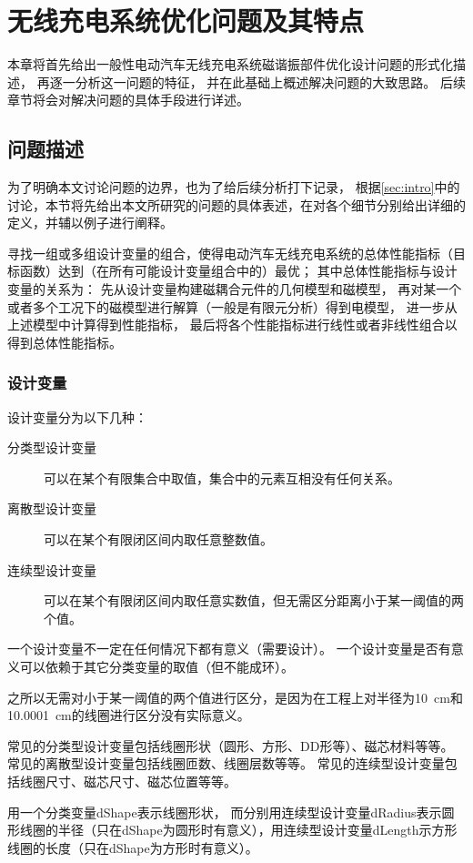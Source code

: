 \documentclass[index]{subfiles}
\begin{document}
\chapter{无线充电系统优化问题及其特点}\label{sec:fea}
本章将首先给出一般性电动汽车无线充电系统磁谐振部件优化设计问题的形式化描述，
再逐一分析这一问题的特征，
并在此基础上概述解决问题的大致思路。
后续章节将会对解决问题的具体手段进行详述。

\section{问题描述}\label{sec:fea-problem}
为了明确本文讨论问题的边界，也为了给后续分析打下记录，
根据\cref{sec:intro}中的讨论，本节将先给出本文所研究的问题的具体表述，在对各个细节分别给出详细的定义，并辅以例子进行阐释。

\begin{definition}[一般性电动汽车无线充电系统磁谐振部件单目标优化设计问题]\label{def:problem}
  寻找一组或多组设计变量的组合，使得电动汽车无线充电系统的总体性能指标（目标函数）达到（在所有可能设计变量组合中的）最优；
  其中总体性能指标与设计变量的关系为：
  先从设计变量构建磁耦合元件的几何模型和磁模型，
  再对某一个或者多个工况下的磁模型进行解算（一般是有限元分析）得到电模型，
  进一步从上述模型中计算得到性能指标，
  最后将各个性能指标进行线性或者非线性组合以得到总体性能指标。
\end{definition}

\subsection{设计变量}
\begin{definition}[设计变量]\label{def:dvars}
  设计变量分为以下几种：
  \begin{description}
    \item[分类型设计变量] 可以在某个有限集合中取值，集合中的元素互相没有任何关系。
    \item[离散型设计变量] 可以在某个有限闭区间内取任意整数值。
    \item[连续型设计变量] 可以在某个有限闭区间内取任意实数值，但无需区分距离小于某一阈值的两个值。
  \end{description}
  一个设计变量不一定在任何情况下都有意义（需要设计）。
  一个设计变量是否有意义可以依赖于其它分类变量的取值（但不能成环）。
\end{definition}
\begin{remark}[连续型设计变量的阈值]
  之所以无需对小于某一阈值的两个值进行区分，是因为在工程上对半径为\SI{10}{\centi\meter}和\SI{10.0001}{\centi\meter}的线圈进行区分没有实际意义。
\end{remark}
\begin{example}[设计变量的分类]
  常见的分类型设计变量包括线圈形状（圆形、方形、DD形等）、磁芯材料等等。
  常见的离散型设计变量包括线圈匝数、线圈层数等等。
  常见的连续型设计变量包括线圈尺寸、磁芯尺寸、磁芯位置等等。
\end{example}
\begin{example}[设计变量的依赖关系]
  用一个分类变量dShape表示线圈形状，
  而分别用连续型设计变量dRadius表示圆形线圈的半径（只在dShape为圆形时有意义），用连续型设计变量dLength示方形线圈的长度（只在dShape为方形时有意义）。
\end{example}
\end{document}
